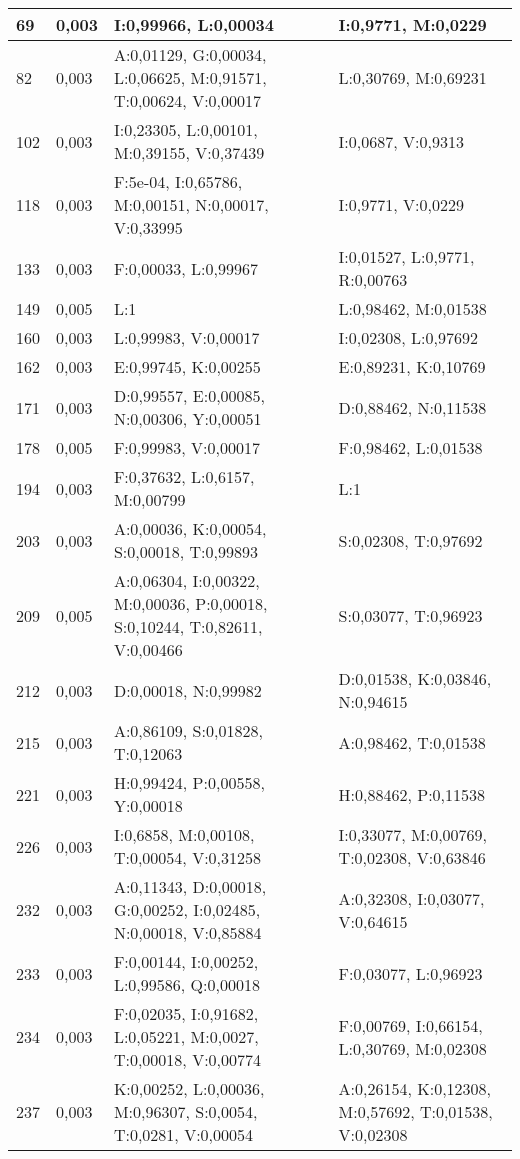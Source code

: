 \begin{landscape}
\begin{longtable}{|l|l|p{10.5cm}|p{10.5cm}|}
	69 & 0,003 & I:0,99966, L:0,00034 & I:0,9771, M:0,0229 \\ \hline 
	82 & 0,003 & A:0,01129, G:0,00034, L:0,06625, M:0,91571, T:0,00624, V:0,00017 & L:0,30769, M:0,69231 \\ \hline 
	102 & 0,003 & I:0,23305, L:0,00101, M:0,39155, V:0,37439 & I:0,0687, V:0,9313 \\ \hline 
	118 & 0,003 & F:5e-04, I:0,65786, M:0,00151, N:0,00017, V:0,33995 & I:0,9771, V:0,0229 \\ \hline 
	133 & 0,003 & F:0,00033, L:0,99967 & I:0,01527, L:0,9771, R:0,00763 \\ \hline 
	149 & 0,005 & L:1 & L:0,98462, M:0,01538 \\ \hline 
	160 & 0,003 & L:0,99983, V:0,00017 & I:0,02308, L:0,97692 \\ \hline 
	162 & 0,003 & E:0,99745, K:0,00255 & E:0,89231, K:0,10769 \\ \hline 
	171 & 0,003 & D:0,99557, E:0,00085, N:0,00306, Y:0,00051 & D:0,88462, N:0,11538 \\ \hline 
	178 & 0,005 & F:0,99983, V:0,00017 & F:0,98462, L:0,01538 \\ \hline 
	194 & 0,003 & F:0,37632, L:0,6157, M:0,00799 & L:1 \\ \hline 
	203 & 0,003 & A:0,00036, K:0,00054, S:0,00018, T:0,99893 & S:0,02308, T:0,97692 \\ \hline 
	209 & 0,005 & A:0,06304, I:0,00322, M:0,00036, P:0,00018, S:0,10244, T:0,82611, V:0,00466 & S:0,03077, T:0,96923 \\ \hline 
	212 & 0,003 & D:0,00018, N:0,99982 & D:0,01538, K:0,03846, N:0,94615 \\ \hline 
	215 & 0,003 & A:0,86109, S:0,01828, T:0,12063 & A:0,98462, T:0,01538 \\ \hline 
	221 & 0,003 & H:0,99424, P:0,00558, Y:0,00018 & H:0,88462, P:0,11538 \\ \hline 
	226 & 0,003 & I:0,6858, M:0,00108, T:0,00054, V:0,31258 & I:0,33077, M:0,00769, T:0,02308, V:0,63846 \\ \hline 
	232 & 0,003 & A:0,11343, D:0,00018, G:0,00252, I:0,02485, N:0,00018, V:0,85884 & A:0,32308, I:0,03077, V:0,64615 \\ \hline 
	233 & 0,003 & F:0,00144, I:0,00252, L:0,99586, Q:0,00018 & F:0,03077, L:0,96923 \\ \hline 
	234 & 0,003 & F:0,02035, I:0,91682, L:0,05221, M:0,0027, T:0,00018, V:0,00774 & F:0,00769, I:0,66154, L:0,30769, M:0,02308 \\ \hline 
	237 & 0,003 & K:0,00252, L:0,00036, M:0,96307, S:0,0054, T:0,0281, V:0,00054 & A:0,26154, K:0,12308, M:0,57692, T:0,01538, V:0,02308 \\ \hline 

\end{longtable}
\end{landscape}
